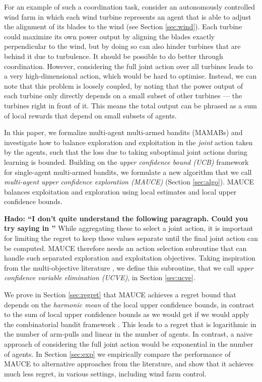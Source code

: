 \documentclass{article}
\def\hado#1{\textcolor{RubineRed}{\textbf{Hado: ``#1''}}}
\begin{document}
For an example of such a coordination task, consider an autonomously controlled wind farm in which each wind turbine represents an agent that is able to adjust the alignment of its blades to the wind (see Section \ref{sec:wind}). Each turbine could maximize its own power output by aligning the blades exactly perpendicular to the wind, but by doing so can also hinder turbines that are behind it due to turbulence.  It should be possible to do better through coordination. However, considering the full joint action over all turbines leads to a very high-dimensional action, which would be hard to optimise. Instead, we can note that this problem is loosely coupled, by noting that the power output of each turbine only directly depends on a small subset of other turbines --- the turbines right in front of it. This means the total output can be phrased as a sum of local rewards that depend on small subsets of agents.

In this paper, we formalize multi-agent multi-armed bandits (MAMABs) and investigate how to balance exploration and exploitation in the \emph{joint} action taken by the agents, such that the loss due to taking suboptimal joint actions during learning is bounded. Building on the \emph{upper confidence bound (UCB)} framework \cite{auer2002finite} for single-agent multi-armed bandits, we formulate a new algorithm that we call \emph{multi-agent upper confidence exploration (MAUCE)} (Section \ref{sec:algo}). MAUCE balances exploitation and exploration using local estimates and local upper confidence bounds.

\hado{I don't quite understand the following paragraph.  Could you try saying in }
While aggregating these to select a joint action, it is important for limiting the regret to keep these values separate until the final joint action can be computed. MAUCE therefore needs an action selection subroutine that can handle such separated exploration and exploitation objectives. Taking inspiration from the multi-objective literature \cite{roijers2015computing}, we define this subroutine, that we call \emph{upper confidence variable elimination (UCVE)}, in Section \ref{sec:ucve}.

We prove in Section \ref{sec:regret} that MAUCE achieves a regret bound that depends on the \emph{harmonic mean} of the local upper confidence bounds, in contrast to the sum of local upper confidence bounds as we would get if we would apply the combinatorial bandit framework \cite{cesa2012combinatorial,chen2013combinatorial}. This leads to a regret that is logarithmic in the number of arm-pulls and linear in the number of agents. In contrast, a naive approach of considering the full joint action would be exponential in the number of agents. In Section \ref{sec:exp} we empirically compare the performance of MAUCE to alternative approaches from the literature, and show that it achieves much less regret, in various settings, including wind farm control. 
\end{document}
